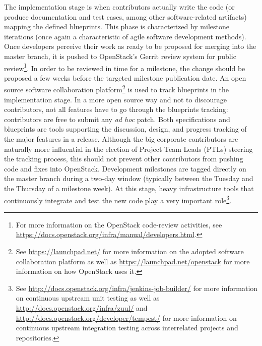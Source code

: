 \documentclass[dvipsnames]{interact}
\theoremstyle{plain}\newtheorem{theorem}{Theorem}[section]
\theoremstyle{definition}
\theoremstyle{remark}
\begin{document}
The implementation stage is when contributors actually write the code (or produce documentation and test cases, among other 
software-related artifacts) mapping the defined blueprints. This phase is characterized by milestone iterations (once again a 
characteristic of agile software development methods). Once developers perceive their work as ready to be proposed for merging into the master branch, it is pushed to OpenStack's Gerrit review system for public review\footnote{For more information on the OpenStack code-review activities, see \url{https://docs.openstack.org/infra/manual/developers.html}.}. In order to be reviewed in time for a milestone, the change should be proposed a few weeks before the targeted milestone publication date. An open source software collaboration platform\footnote{See \url{https://launchpad.net/} for more information on the adopted software collaboration platform as well as \url{https://launchpad.net/openstack} for more information on how OpenStack uses it.}  is used to track blueprints in the implementation stage. In a more open source way and not to discourage contributors, not all features have to go through the blueprints tracking: contributors are free to submit any \emph{ad hoc} patch. Both specifications and blueprints are tools supporting the discussion, design, and progress tracking of the major features in a release. Although the big corporate contributors are naturally more influential in the election of Project Team Leads (PTLs) steering the tracking process, this should not prevent other contributors from pushing code and fixes into OpenStack. Development milestones are tagged directly on the master branch during a two-day window (typically between the Tuesday and the Thursday of a milestone week). At this stage, heavy infrastructure tools that continuously integrate and test the new code play a very important role\footnote{See \url{http://docs.openstack.org/infra/jenkins-job-builder/} for more information on continuous upstream unit testing as well as  \url{http://docs.openstack.org/infra/zuul/} and \url{http://docs.openstack.org/developer/tempest/} for more information on continuous upstream integration testing across interrelated projects and repositories.}.
\end{document}
